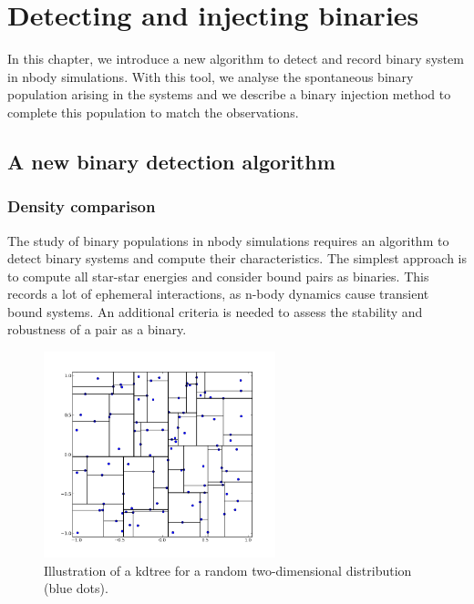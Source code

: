 
\chapter{Detecting and injecting binaries}


In this chapter, we introduce a new algorithm to detect and record binary system in nbody simulations. With this tool, we analyse the spontaneous binary population arising in the \HubLem systems and we describe a binary injection method to complete this population to match the observations.


\minitoc

\section{A new binary detection algorithm}


\subsection{Density comparison}

The study of binary populations in nbody simulations requires an algorithm to detect binary systems and compute their characteristics. The simplest approach is to compute all star-star energies and consider bound pairs as binaries. This records a lot of ephemeral interactions, as n-body dynamics cause transient bound systems. An additional criteria is needed to assess the stability and robustness of a pair as a binary.

\begin{figure}
\begin{center}
\includegraphics[width=0.6\textwidth]{Figures/5_kdtree}
\caption{Illustration of a kdtree for a random two-dimensional distribution (blue dots).}
\label{Fig:5_kdtree}
\end{center}
\end{figure}


